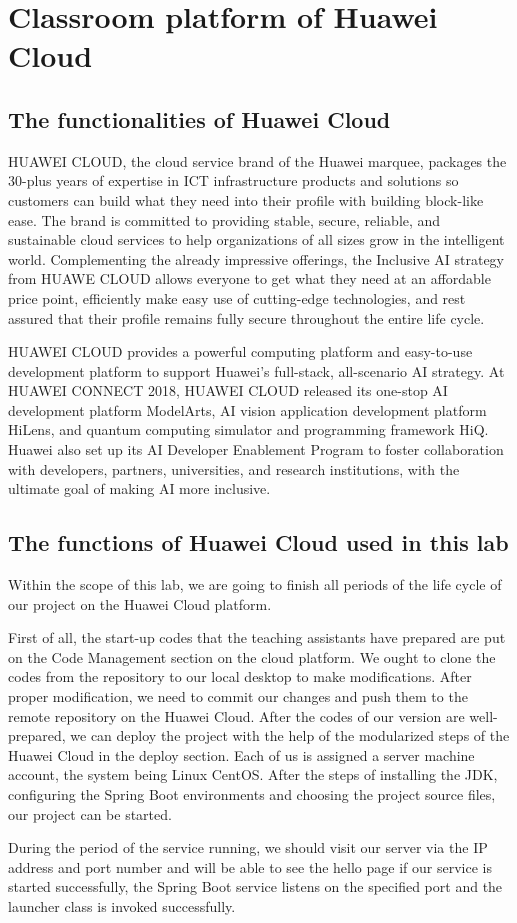 \documentclass[a4paper]{report}
\begin{document}
\section{Classroom platform of Huawei Cloud}
\subsection{The functionalities of Huawei Cloud}
HUAWEI CLOUD, the cloud service brand of the Huawei marquee, packages the 30-plus years of expertise in ICT infrastructure products and solutions so customers can build what they need into their profile with building block-like ease. The brand is committed to providing stable, secure, reliable, and sustainable cloud services to help organizations of all sizes grow in the intelligent world. Complementing the already impressive offerings, the Inclusive AI strategy from HUAWE CLOUD allows everyone to get what they need at an affordable price point, efficiently make easy use of cutting-edge technologies, and rest assured that their profile remains fully secure throughout the entire life cycle.
\par
HUAWEI CLOUD provides a powerful computing platform and easy-to-use development platform to support Huawei's full-stack, all-scenario AI strategy. At HUAWEI CONNECT 2018, HUAWEI CLOUD released its one-stop AI development platform ModelArts, AI vision application development platform HiLens, and quantum computing simulator and programming framework HiQ. Huawei also set up its AI Developer Enablement Program to foster collaboration with developers, partners, universities, and research institutions, with the ultimate goal of making AI more inclusive.
\subsection{The functions of Huawei Cloud used in this lab}
Within the scope of this lab, we are going to finish all periods of the life cycle of our project on the Huawei Cloud platform.
\par
First of all, the start-up codes that the teaching assistants have prepared are put on the Code Management section on the cloud platform. We ought to clone the codes from the repository to our local desktop to make modifications. After proper modification, we need to commit our changes and push them to the remote repository on the Huawei Cloud. After the codes of our version are well-prepared, we can deploy the project with the help of the modularized steps of the Huawei Cloud in the deploy section. Each of us is assigned a server machine account, the system being Linux CentOS. After the steps of installing the JDK, configuring the Spring Boot environments and choosing the project source files, our project can be started.
\par
During the period of the service running, we should visit our server via the IP address and port number and will be able to see the hello page if our service is started successfully, the Spring Boot service listens on the specified port and the launcher class is invoked successfully.
\end{document}
